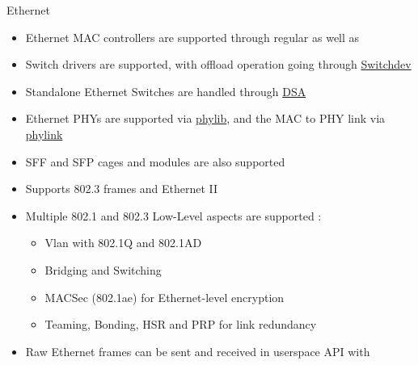 \begin{frame}{Ethernet}
	\begin{itemize}
		\item Ethernet MAC controllers are supported through regular  as well as 
		\item Switch drivers are supported, with offload operation going through \href{https://docs.kernel.org/networking/switchdev.html}{Switchdev}
		\item Standalone Ethernet Switches are handled through \href{https://docs.kernel.org/networking/dsa/dsa.html}{DSA}
		\item Ethernet PHYs are supported via \href{https://docs.kernel.org/networking/phy.html}{phylib}, and the MAC to PHY link via \href{https://docs.kernel.org/networking/sfp-phylink.html}{phylink}
		\item SFF and SFP cages and modules are also supported
		\item Supports 802.3 frames and Ethernet II
		\item Multiple 802.1 and 802.3 Low-Level aspects are supported :
			\begin{itemize}
				\item Vlan with 802.1Q and 802.1AD
				\item Bridging and Switching
				\item MACSec (802.1ae) for Ethernet-level encryption
				\item Teaming, Bonding, HSR and PRP for link redundancy
			\end{itemize}
		\item Raw Ethernet frames can be sent and received in userspace API with 
	\end{itemize}
\end{frame}

